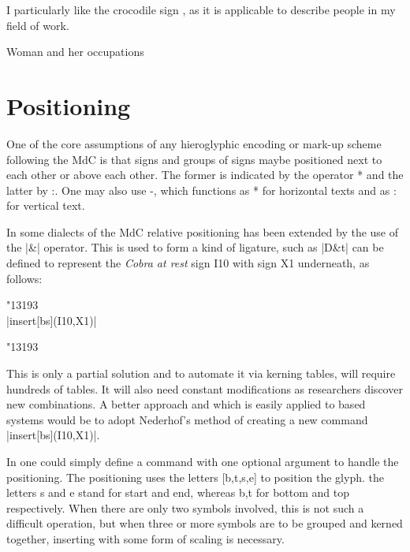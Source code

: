 I particularly like the crocodile sign \def\crocodile{} {\crocodile}, as it is applicable to describe people in my field of work. 

\begin{scriptexample}[]{Woman and her occupations}
\end{scriptexample}

\section{Positioning}

One of the core assumptions of any hieroglyphic encoding or mark-up scheme following the MdC is that signs and groups of signs maybe positioned next to each other or above each other. The former is indicated by the operator * and the latter by :. One may also use -, which functions as * for horizontal texts and as : for vertical text. 

In some dialects of the MdC relative positioning has been extended by the use of the |&| operator. This is used to form a kind of ligature, such as |D&t| can be defined to represent the \textit{Cobra at rest} sign I10 with sign X1 underneath, as follows:

\begin{center}
{\hiero\HUGE
       \mbox{\char"13193\hfill\hfill}\\
       {\large|insert[bs](I10,X1)|}

\mbox{\rlap{\scalebox{0.5}{\char"133E3}}\char"13193\hfill\hfill}\\
 	
}
\end{center}

This is only a partial solution and to automate it via kerning tables, will require hundreds of tables. It will also need constant modifications as researchers discover new combinations. A better approach and which is easily applied to \tex based systems would be to adopt Nederhof's method of creating a new command |insert[bs](I10,X1)|. 

In \tex one could simply define a command \cmd{\insert} with one optional argument to handle the positioning. The positioning uses the letters [b,t,s,e] to position the glyph. the letters s and e stand for start and end, whereas b,t for bottom and top respectively. When there are only two symbols involved, this is not such a difficult operation, but when three or more symbols are to be grouped and kerned together, inserting with some form of scaling is necessary.

